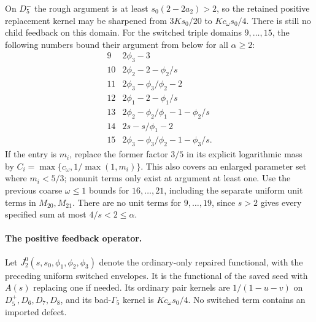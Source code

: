 On $D_5^-$ the rough argument is at least
$s_0(2-2a_2)>2$, so the retained positive replacement kernel may
be sharpened from $3Ks_0/20$ to $Kc_\omega s_0/4$.
There is still no child feedback on this domain.
For the switched triple domains $9,\ldots,15$, the following
numbers bound their argument from below for all $\alpha\ge2$:
\[
\begin{array}{c|l}
9&2\phi_3-3\\
10&2\phi_2-2-\phi_2/s\\
11&2\phi_3-\phi_3/\phi_2-2\\
12&2\phi_1-2-\phi_1/s\\
13&2\phi_2-\phi_2/\phi_1-1-\phi_2/s\\
14&2s-s/\phi_1-2\\
15&2\phi_3-\phi_3/\phi_2-1-\phi_3/s.
\end{array}
\]
If the entry is $m_i$, replace the former factor $3/5$ in its
explicit logarithmic mass by
$C_i=\max\{c_\omega,1/\max(1,m_i)\}$.
This also covers an enlarged parameter set where $m_i<5/3$;
nonunit terms only exist at argument at least one.
Use the previous coarse $\omega\le1$ bounds for $16,\ldots,21$,
including the separate uniform unit terms in $M_{20},M_{21}$.
There are no unit terms for $9,\ldots,19$, since $s>2$ gives
every specified sum at most $4/s<2\le\alpha$.

\paragraph{The positive feedback operator.}
Let $J_2^0(s,s_0,\phi_1,\phi_2,\phi_3)$ denote the ordinary-only
repaired functional, with the preceding uniform switched envelopes.
It is the functional of the saved seed with $A(s)$ replacing one
if needed.  Its ordinary pair kernels are $1/(1-u-v)$ on
$D_5^+,D_6,D_7,D_8$, and its bad-$\Gamma_5$ kernel is
$Kc_\omega s_0/4$.  No switched term contains an imported defect.

